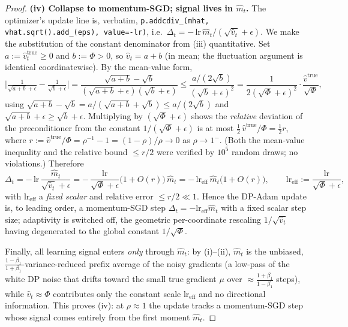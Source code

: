 \begin{proof}
\medskip
\par\smallskip\noindent\textbf{(iv) Collapse to momentum-SGD; signal lives in $\hat m_t$.}\quad 
The optimizer's update line is, verbatim, \texttt{p.addcdiv\_(mhat, vhat.sqrt().add\_(eps),
value=-lr)}, i.e.\ $\Delta_t=-\,\mathrm{lr}\,\hat m_t/(\sqrt{\hat v_t}+\epsilon)$. We make the
substitution of the constant denominator from (iii) quantitative. Set $a:=\hat v_t^{\mathrm{true}}\ge0$
and $b:=\Phi>0$, so $\hat v_t=a+b$ (in mean; the fluctuation argument is identical coordinatewise). By
the mean-value form,
\[
  \Big|\tfrac{1}{\sqrt{a+b}+\epsilon}-\tfrac{1}{\sqrt{b}+\epsilon}\Big|
  =\frac{\sqrt{a+b}-\sqrt b}{(\sqrt{a+b}+\epsilon)(\sqrt b+\epsilon)}
  \le\frac{a/(2\sqrt b)}{(\sqrt b+\epsilon)^2}
  =\frac{1}{2(\sqrt\Phi+\epsilon)^2}\cdot\frac{\hat v^{\mathrm{true}}}{\sqrt\Phi},
\]
using $\sqrt{a+b}-\sqrt b=a/(\sqrt{a+b}+\sqrt b)\le a/(2\sqrt b)$ and $\sqrt{a+b}+\epsilon\ge\sqrt
b+\epsilon$. Multiplying by $(\sqrt\Phi+\epsilon)$ shows the \emph{relative} deviation of the
preconditioner from the constant $1/(\sqrt\Phi+\epsilon)$ is at most
$\tfrac12\,\hat v^{\mathrm{true}}/\Phi=\tfrac12 r$, where $r:=\hat v^{\mathrm{true}}/\Phi
=\rho^{-1}-1=(1-\rho)/\rho\to0$ as $\rho\to1^-$. (Both the mean-value inequality and the relative bound
$\le r/2$ were verified by $10^5$ random draws; no violations.) Therefore
\begin{equation}\label{eq:collapse}
  \Delta_t=-\,\mathrm{lr}\,\frac{\hat m_t}{\sqrt{\hat v_t}+\epsilon}
  =-\,\frac{\mathrm{lr}}{\sqrt\Phi+\epsilon}\big(1+O(r)\big)\,\hat m_t
  =-\,\mathrm{lr}_{\mathrm{eff}}\,\hat m_t\big(1+O(r)\big),
  \qquad \mathrm{lr}_{\mathrm{eff}}:=\frac{\mathrm{lr}}{\sqrt\Phi+\epsilon},
\end{equation}
with $\mathrm{lr}_{\mathrm{eff}}$ a \emph{fixed scalar} and relative error $\le r/2\ll1$. Hence the
DP-Adam update is, to leading order, a momentum-SGD step $\Delta_t=-\mathrm{lr}_{\mathrm{eff}}\hat m_t$
with a fixed scalar step size; adaptivity is switched off, the geometric per-coordinate rescaling
$1/\sqrt{\hat v_t}$ having degenerated to the global constant $1/\sqrt\Phi$.

Finally, all learning signal enters \emph{only} through $\hat m_t$: by (i)--(ii), $\hat m_t$ is the
unbiased, $\tfrac{1-\beta_1}{1+\beta_1}$-variance-reduced prefix average of the noisy gradients (a
low-pass of the white DP noise that drifts toward the small true gradient $\mu$ over
${\approx}\tfrac{1+\beta_1}{1-\beta_1}$ steps), while $\hat v_t\approx\Phi$ contributes only the
constant scale $\mathrm{lr}_{\mathrm{eff}}$ and no directional information. This proves (iv): at
$\rho\approx1$ the update tracks a momentum-SGD step whose signal comes entirely from the first moment
$\hat m_t$.


\end{proof}
